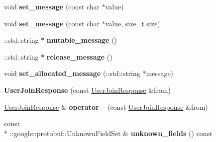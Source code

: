 \begin{DoxyCompactItemize}
\item 
\hypertarget{classSimpleChat_1_1UserJoinResponse_a89be458afc1d17022948e78ce5012d01}{void {\bfseries set\-\_\-message} (const char $\ast$value)}\label{classSimpleChat_1_1UserJoinResponse_a89be458afc1d17022948e78ce5012d01}

\item 
\hypertarget{classSimpleChat_1_1UserJoinResponse_a63c1f7f88f7f2cbea3ce7760f4304a9f}{void {\bfseries set\-\_\-message} (const char $\ast$value, size\-\_\-t size)}\label{classSimpleChat_1_1UserJoinResponse_a63c1f7f88f7f2cbea3ce7760f4304a9f}

\item 
\hypertarget{classSimpleChat_1_1UserJoinResponse_af83bf2f000e4eb8d94fdb7dcfd5294c1}{\-::std\-::string $\ast$ {\bfseries mutable\-\_\-message} ()}\label{classSimpleChat_1_1UserJoinResponse_af83bf2f000e4eb8d94fdb7dcfd5294c1}

\item 
\hypertarget{classSimpleChat_1_1UserJoinResponse_a6e63ebf7f109e35143f972e400353401}{\-::std\-::string $\ast$ {\bfseries release\-\_\-message} ()}\label{classSimpleChat_1_1UserJoinResponse_a6e63ebf7f109e35143f972e400353401}

\item 
\hypertarget{classSimpleChat_1_1UserJoinResponse_af8e62cfb486c721d18f77e48ab00d143}{void {\bfseries set\-\_\-allocated\-\_\-message} (\-::std\-::string $\ast$message)}\label{classSimpleChat_1_1UserJoinResponse_af8e62cfb486c721d18f77e48ab00d143}

\item 
\hypertarget{classSimpleChat_1_1UserJoinResponse_a6ac5c504a53a80a0bd9b8135c83743e3}{{\bfseries User\-Join\-Response} (const \hyperlink{classSimpleChat_1_1UserJoinResponse}{User\-Join\-Response} \&from)}\label{classSimpleChat_1_1UserJoinResponse_a6ac5c504a53a80a0bd9b8135c83743e3}

\item 
\hypertarget{classSimpleChat_1_1UserJoinResponse_a7b819a45d55784fa256405d0a09ed471}{\hyperlink{classSimpleChat_1_1UserJoinResponse}{User\-Join\-Response} \& {\bfseries operator=} (const \hyperlink{classSimpleChat_1_1UserJoinResponse}{User\-Join\-Response} \&from)}\label{classSimpleChat_1_1UserJoinResponse_a7b819a45d55784fa256405d0a09ed471}

\item 
\hypertarget{classSimpleChat_1_1UserJoinResponse_a820b6d83a86ef347ce85fda4bdf322bd}{const \\*
\-::google\-::protobuf\-::\-Unknown\-Field\-Set \& {\bfseries unknown\-\_\-fields} () const }\label{classSimpleChat_1_1UserJoinResponse_a820b6d83a86ef347ce85fda4bdf322bd}


\end{DoxyCompactItemize}
